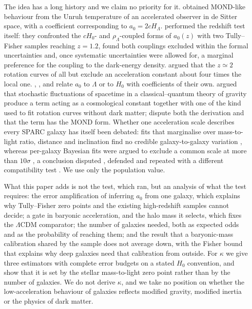 \documentclass[fleqn,usenatbib]{mnras}
\begin{document}
The idea has a long history and we claim no priority for it. \citet{Milgrom1999} obtained MOND-like behaviour from the Unruh temperature of an accelerated observer in de Sitter space, with a coefficient corresponding to $a_0=2cH_\Lambda$. \citet{Limbach2008} performed the redshift test itself: they confronted the $cH_0$- and $\rho_\Lambda$-coupled forms of $a_0(z)$ with two Tully--Fisher samples reaching $z=1.2$, found both couplings excluded within the formal uncertainties and, once systematic uncertainties were allowed for, a marginal preference for the coupling to the dark-energy density. \citet{Milgrom2017} argued that the $z\simeq2$ rotation curves of \citet{Genzel2017} all but exclude an acceleration constant about four times the local one. \citet{BlanchetLeTiec2009}, \citet{KlinkhamerKopp2011}, \citet{Verlinde2017} and \citet{Milgrom2020} relate $a_0$ to $\Lambda$ or to $H_0$ with coefficients of their own. \citet{OppenheimRusso2024} argued that stochastic fluctuations of spacetime in a classical--quantum theory of gravity produce a term acting as a cosmological constant together with one of the kind used to fit rotation curves without dark matter; \citet{HertzbergLoeb2024} dispute both the derivation and that the term has the MOND form. Whether one acceleration scale describes every SPARC galaxy has itself been debated: fits that marginalise over mass-to-light ratio, distance and inclination find no credible galaxy-to-galaxy variation \citep{Li2018}, whereas per-galaxy Bayesian fits were argued to exclude a common scale at more than $10\sigma$ \citep{Rodrigues2018}, a conclusion disputed \citep{McGaugh2018,Kroupa2018}, defended \citep{Rodrigues2018b} and repeated with a different compatibility test \citep{Marra2020}. We use only the population value.

What this paper adds is not the test, which \citet{Limbach2008} ran, but an analysis of what the test requires: the error amplification of inferring $a_0$ from one galaxy, which explains why Tully--Fisher zero points and the existing high-redshift samples cannot decide; a gate in baryonic acceleration, and the halo mass it selects, which fixes the $\Lambda$CDM comparator; the number of galaxies needed, both as expected odds and as the probability of reaching them; and the result that a baryonic-mass calibration shared by the sample does not average down, with the Fisher bound that explains why deep galaxies need that calibration from outside. For $\kappa$ we give three estimators with complete error budgets on a stated $H_0$ convention, and show that it is set by the stellar mass-to-light zero point rather than by the number of galaxies. We do not derive $\kappa$, and we take no position on whether the low-acceleration behaviour of galaxies reflects modified gravity, modified inertia or the physics of dark matter.
\end{document}
